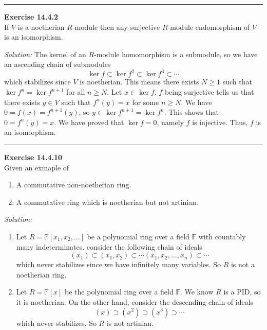 \documentclass[a4paper, 12pt]{article}
\newenvironment{problem}[2][Exercise]
    { \begin{mdframed}[backgroundcolor=gray!20] \textbf{#1 #2} \\}
    {  \end{mdframed}}
\newenvironment{solution}
    {\textit{Solution:}}
    {}
\begin{document}
\noindent\rule{7in}{2.8pt}
\begin{problem}{14.4.2}
If \(V\) is a noetherian \(R\)-module then any surjective \(R\)-module endomorphism of \(V\) is an isomorphism.
\end{problem}
\begin{solution}
The kernel of an \(R\)-module homomorphism is a submodule, so we have an ascending chain of submodules 
\[\ker f\subset \ker f^2\subset \ker f^3\subset \cdots\]
which stabilizes since \(V\) is noetherian. This means there exists \(N\geq 1\) such that \(\ker f^n=\ker f^{n+1} \) for all \(n\geq N\). Let \(x\in \ker f\). \(f\) being surjective tells us that 
there exists \(y\in V\) such that \(f^n(y)=x\) for some \(n\geq N\). We have \(0=f(x)=f^{n+1}(y)\), so \(y\in \ker f^{n+1}=\ker f^n\). This shows that \(0=f^n(y)=x\). We have proved that 
\(\ker f=0\), namely \(f\) is injective. Thus, \(f\) is an isomorphism. 
\end{solution}

\noindent\rule{7in}{2.8pt}
\begin{problem}{14.4.10}
Given an exmaple of 
\begin{enumerate}[(1)]
\item A commutative non-noetherian ring.
\item A commutative ring which is noetherian but not artinian.
\end{enumerate}
\end{problem}
\begin{solution}
\begin{enumerate}[(1)]
\item Let \(R=\mathbb{F}[x_1,x_2,\ldots]\) be a polynomial ring over a field \(\mathbb{F}\) with countably many indeterminates. consider the following chain of ideals 
\[(x_1)\subset (x_1,x_2)\subset \cdots (x_1,x_2,\ldots,x_n)\subset \cdots\]
which never stabilizes since we have infinitely many variables. So \(R\) is not a noetherian ring.
\item Let \(R=\mathbb{F}[x]\) be the polynomial ring over a field \(\mathbb{F}\). We know \(R\) is a PID, so it is noetherian. On the other hand, consider the descending chain of ideals 
\[(x)\supset (x^2)\supset (x^3)\supset \cdots\]
which never stabilizes. So \(R\) is not artinian.
\end{enumerate}  
\end{solution}
\end{document}
